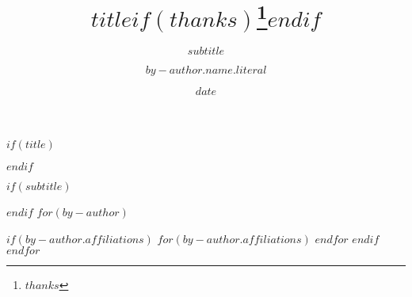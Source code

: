 $if(title)$
\title{$title$$if(thanks)$\thanks{$thanks$}$endif$}
$endif$

$if(subtitle)$
\subtitle{$subtitle$}
$endif$
$for(by-author)$
\usepackage{academicons}
\usepackage{xcolor}

  \author{$by-author.name.literal$}
  $if(by-author.affiliations)$
    $for(by-author.affiliations)$
    $endfor$
  $endif$
$endfor$



\date{$date$}